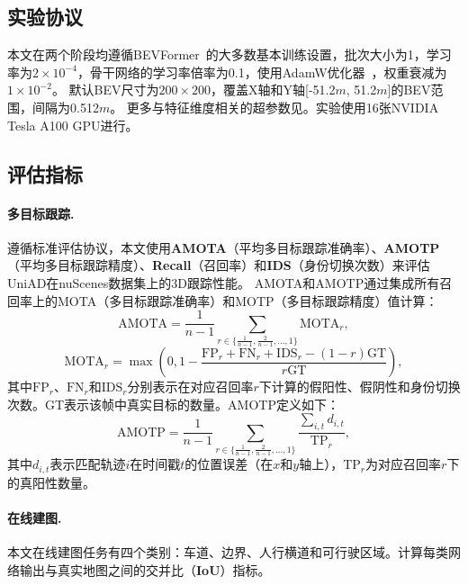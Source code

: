 \documentclass[10pt,twocolumn,letterpaper]{article}
\begin{document}
\subsection{实验协议}
\label{sec:exp-protocol}

本文在两个阶段均遵循BEVFormer~\cite{li2022bevformer}的大多数基本训练设置，批次大小为1，学习率为$2\!\times\!10^{-4}$，骨干网络的学习率倍率为0.1，使用AdamW优化器~\cite{adamw}，权重衰减为$1\!\times\!10^{-2}$。
%
默认BEV尺寸为$200\!\times\!200$，覆盖X轴和Y轴[-51.2$m$, 51.2$m$]的BEV范围，间隔为0.512$m$。
%
更多与特征维度相关的超参数见。实验使用16张NVIDIA Tesla A100 GPU进行。


\subsection{评估指标}
\label{sec:exp-metric}
\paragraph{多目标跟踪.}
遵循标准评估协议，本文使用\textbf{AMOTA}（平均多目标跟踪准确率）、\textbf{AMOTP}（平均多目标跟踪精度）、\textbf{Recall}（召回率）和\textbf{IDS}（身份切换次数）来评估UniAD在nuScenes数据集上的3D跟踪性能。
%
AMOTA和AMOTP通过集成所有召回率上的MOTA（多目标跟踪准确率）和MOTP（多目标跟踪精度）值计算：
%
\begin{equation}
    \label{eq:amota}
    \text{AMOTA} = \frac{1}{n-1}\sum_{r\in\{\frac{1}{n-1}, \frac{2}{n-1},...,1\}}
    \text{MOTA}_{r},
\end{equation}
%
\begin{equation}
    \label{eq:mota}
    \text{MOTA}_{r} = \mathop{\max}(0, 1-\frac{\text{FP}_{r}+\text{FN}_{r}+\text{IDS}_{r}-(1-r)\text{GT}}{r\text{GT}}),
\end{equation}
%
其中$\text{FP}_{r}$、$\text{FN}_{r}$和$\text{IDS}_{r}$分别表示在对应召回率$r$下计算的假阳性、假阴性和身份切换次数。GT表示该帧中真实目标的数量。AMOTP定义如下：
%
\begin{equation}
    \label{eq:amotp}
    \text{AMOTP} =
    \frac{1}{n-1}\sum_{r\in\{\frac{1}{n-1}, \frac{2}{n-1},...,1\}}
    \frac{\sum_{i,t}d_{i,t}}{\text{TP}_r},
\end{equation}
%
其中$d_{i,t}$表示匹配轨迹$i$在时间戳$t$的位置误差（在$x$和$y$轴上），$\text{TP}_r$为对应召回率$r$下的真阳性数量。

\paragraph{在线建图.} 本文在线建图任务有四个类别：车道、边界、人行横道和可行驶区域。计算每类网络输出与真实地图之间的交并比（\textbf{IoU}）指标。
\end{document}

